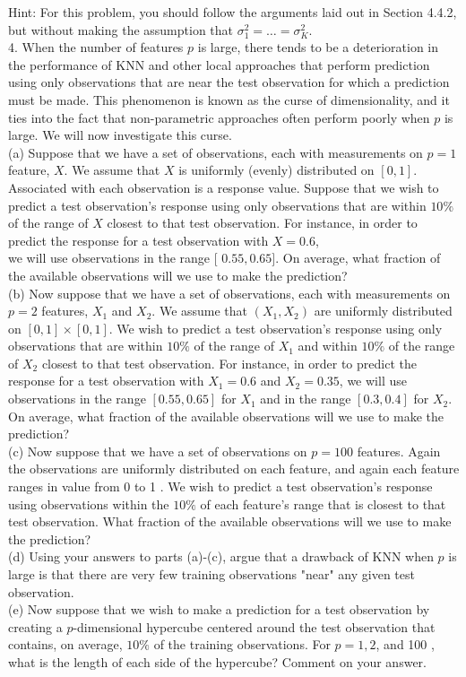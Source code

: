 \documentclass[10pt]{article}
\begin{document}
Hint: For this problem, you should follow the arguments laid out in Section 4.4.2, but without making the assumption that $\sigma_{1}^{2}=\ldots=\sigma_{K}^{2}$.\\
4. When the number of features $p$ is large, there tends to be a deterioration in the performance of KNN and other local approaches that perform prediction using only observations that are near the test observation for which a prediction must be made. This phenomenon is known as the curse of dimensionality, and it ties into the fact that non-parametric approaches often perform poorly when $p$ is large. We will now investigate this curse.\\
(a) Suppose that we have a set of observations, each with measurements on $p=1$ feature, $X$. We assume that $X$ is uniformly (evenly) distributed on $[0,1]$. Associated with each observation is a response value. Suppose that we wish to predict a test observation's response using only observations that are within $10 \%$ of the range of $X$ closest to that test observation. For instance, in order to predict the response for a test observation with $X=0.6$,\\
we will use observations in the range [ $0.55,0.65]$. On average, what fraction of the available observations will we use to make the prediction?\\
(b) Now suppose that we have a set of observations, each with measurements on $p=2$ features, $X_{1}$ and $X_{2}$. We assume that $\left(X_{1}, X_{2}\right)$ are uniformly distributed on $[0,1] \times[0,1]$. We wish to predict a test observation's response using only observations that are within $10 \%$ of the range of $X_{1}$ and within $10 \%$ of the range of $X_{2}$ closest to that test observation. For instance, in order to predict the response for a test observation with $X_{1}=0.6$ and $X_{2}=0.35$, we will use observations in the range $[0.55,0.65]$ for $X_{1}$ and in the range $[0.3,0.4]$ for $X_{2}$. On average, what fraction of the available observations will we use to make the prediction?\\
(c) Now suppose that we have a set of observations on $p=100$ features. Again the observations are uniformly distributed on each feature, and again each feature ranges in value from 0 to 1 . We wish to predict a test observation's response using observations within the $10 \%$ of each feature's range that is closest to that test observation. What fraction of the available observations will we use to make the prediction?\\
(d) Using your answers to parts (a)-(c), argue that a drawback of KNN when $p$ is large is that there are very few training observations "near" any given test observation.\\
(e) Now suppose that we wish to make a prediction for a test observation by creating a $p$-dimensional hypercube centered around the test observation that contains, on average, $10 \%$ of the training observations. For $p=1,2$, and 100 , what is the length of each side of the hypercube? Comment on your answer.
\end{document}

